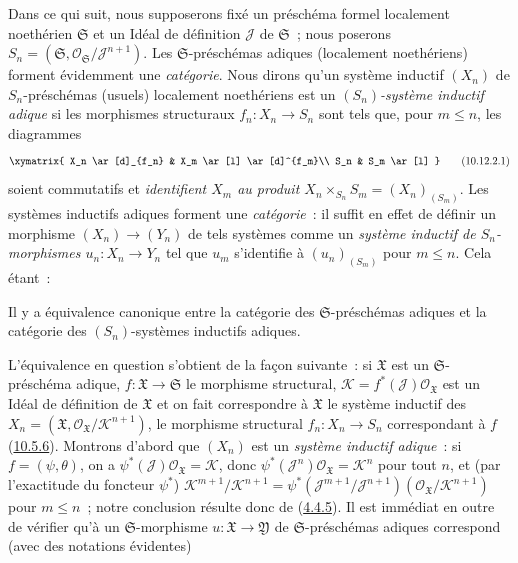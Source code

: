 \begin{env}[10.12.2]
\label{I.10.12.2-fr}
Dans ce qui suit, nous supposerons fixé un préschéma formel localement
noethérien $\mathfrak{S}$ et un Idéal de définition $\mathscr{J}$ de
$\mathfrak{S}$~; nous poserons
$S_n=(\mathfrak{S},\mathscr{O}_{\mathfrak{S}}/\mathscr{J}^{n+1})$. Les
$\mathfrak{S}$-préschémas adiques (localement noethériens) forment
évidemment une \emph{catégorie}. Nous dirons qu'un système inductif
$(X_n)$ de $S_n$-préschémas (usuels) localement noethériens est un
\emph{$(S_n)$-système inductif adique} si les morphismes structuraux
$f_n:X_n\to S_n$ sont tels que, pour $m\leq n$, les diagrammes
\[
  \label{I.10.12.2.1-fr}
  \xymatrix{
    X_n \ar[d]_{f_n}
    & X_m \ar[l] \ar[d]^{f_m}\\
    S_n
    & S_m \ar[l]
  }
  \tag{10.12.2.1}
\]
soient commutatifs et \emph{identifient $X_m$ au produit
$X_n\times_{S_n}S_m=(X_n)_{(S_m)}$}. Les systèmes inductifs adiques
forment une \emph{catégorie}~: il suffit en effet de définir un morphisme
$(X_n)\to(Y_n)$ de tels systèmes comme un \emph{système inductif de
$S_n$-morphismes $u_n:X_n\to Y_n$} tel que $u_m$ s'identifie à
$(u_n)_{(S_m)}$ pour $m\leq n$. Cela étant~:
\end{env}

\begin{theorem}[10.12.3]
\label{I.10.12.3-fr}
Il y a équivalence canonique entre la catégorie des
$\mathfrak{S}$-préschémas adiques et la catégorie des
$(S_n)$-systèmes inductifs adiques.
\end{theorem}

L'équivalence en question s'obtient de la façon suivante~: si
$\mathfrak{X}$ est un $\mathfrak{S}$-préschéma adique,
$f:\mathfrak{X}\to\mathfrak{S}$ le morphisme structural,
$\mathscr{K}=f^*(\mathscr{J})\mathscr{O}_{\mathfrak{X}}$ est un Idéal de
définition de $\mathfrak{X}$ et on fait correspondre à $\mathfrak{X}$ le
système inductif des
$X_n=(\mathfrak{X},\mathscr{O}_{\mathfrak{X}}/\mathscr{K}^{n+1})$, le
morphisme structural $f_n:X_n\to S_n$ correspondant à $f$
(\hyperref[I.10.5.6-fr]{10.5.6}). Montrons d'abord que $(X_n)$ est un
\emph{système inductif adique}~: si $f=(\psi,\theta)$, on a
$\psi^*(\mathscr{J})\mathscr{O}_{\mathfrak{X}}=\mathscr{K}$, donc
$\psi^*(\mathscr{J}^n)\mathscr{O}_{\mathfrak{X}}=\mathscr{K}^n$ pour tout
$n$, et (par l'exactitude du foncteur $\psi^*$)
$\mathscr{K}^{m+1}/\mathscr{K}^{n+1}
=\psi^*(\mathscr{J}^{m+1}/\mathscr{J}^{n+1})
(\mathscr{O}_{\mathfrak{X}}/\mathscr{K}^{n+1})$ pour $m\leq n$~; notre
conclusion résulte donc de (\hyperref[I.4.4.5-fr]{4.4.5}). Il est immédiat
en outre de vérifier qu'à un $\mathfrak{S}$-morphisme
$u:\mathfrak{X}\to\mathfrak{Y}$ de $\mathfrak{S}$-préschémas adiques
correspond (avec des notations évidentes)

